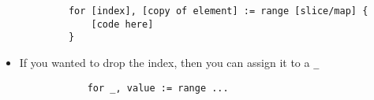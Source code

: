 \documentclass[11pt, oneside]{article}   	%
\begin{document}
\begin{itemize}
\begin{itemize}
\begin{verbatim}
            for [index], [copy of element] := range [slice/map] {
                [code here]
            }
          \end{verbatim}
          \begin{itemize}
            \item If you wanted to drop the index, then you can assign it to a \texttt{\_}
            \begin{verbatim}
            for _, value := range ...
            \end{verbatim}
          \end{itemize}
      \end{itemize}
  \end{itemize}
\end{document}
